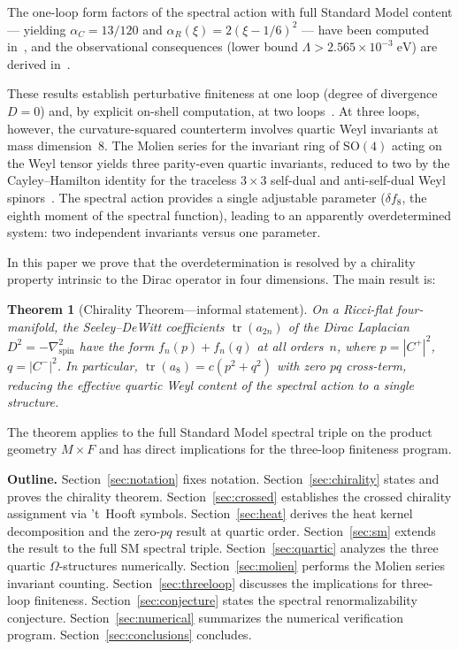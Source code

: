 \documentclass[12pt,a4paper]{article}
\newtheorem{theorem}{Theorem}[section]
\theoremstyle{definition}
\theoremstyle{remark}
\newcommand{\tr}{\operatorname{tr}}
\newcommand{\Lam}{\Lambda}
\begin{document}
The one-loop form factors of the spectral action with full Standard Model
content --- yielding $\alpha_C = 13/120$ and
$\alpha_R(\xi) = 2(\xi - 1/6)^2$ --- have been computed
in~\cite{Alfyorov:2026ff}, and the observational consequences (lower bound
$\Lam > 2.565 \times 10^{-3}\;\mathrm{eV}$) are derived
in~\cite{Alfyorov:2026ss}.

These results establish perturbative finiteness at one loop (degree of
divergence $D = 0$) and, by explicit on-shell computation, at two
loops~\cite{Goroff:1985th,Stelle:1976gc}.  At three loops, however, the
curvature-squared counterterm involves quartic Weyl invariants at mass
dimension~8.  The Molien series for the invariant ring of $\mathrm{SO}(4)$
acting on the Weyl tensor yields three parity-even quartic invariants,
reduced to two by the Cayley--Hamilton identity for the traceless $3 \times 3$
self-dual and anti-self-dual Weyl
spinors~\cite{Fulling:1992vm}.  The spectral action provides a single
adjustable parameter ($\delta f_8$, the eighth moment of the spectral
function), leading to an apparently overdetermined system:
two independent invariants versus one parameter.

In this paper we prove that the overdetermination is resolved by a chirality
property intrinsic to the Dirac operator in four dimensions.  The main result
is:

\begin{theorem}[Chirality Theorem---informal statement]
\label{thm:informal}
On a Ricci-flat four-manifold, the Seeley--DeWitt coefficients
$\tr(a_{2n})$ of the Dirac Laplacian $D^2 = -\nabla^2_{\mathrm{spin}}$
have the form $f_n(p) + f_n(q)$ at all orders~$n$, where
$p = |C^+|^2$, $q = |C^-|^2$.  In particular, $\tr(a_8) = c(p^2 + q^2)$
with zero $pq$ cross-term, reducing the effective quartic Weyl content of
the spectral action to a single structure.
\end{theorem}

\noindent The theorem applies to the full Standard Model spectral triple on the
product geometry $M \times F$ and has direct implications for the three-loop
finiteness program.

\medskip
\noindent\textbf{Outline.}
Section~\ref{sec:notation} fixes notation.  Section~\ref{sec:chirality}
states and proves the chirality theorem.  Section~\ref{sec:crossed}
establishes the crossed chirality assignment via 't~Hooft symbols.
Section~\ref{sec:heat} derives the heat kernel decomposition and the
zero-$pq$ result at quartic order.  Section~\ref{sec:sm} extends the
result to the full SM spectral triple.  Section~\ref{sec:quartic} analyzes
the three quartic $\Omega$-structures numerically.
Section~\ref{sec:molien} performs the Molien series invariant counting.
Section~\ref{sec:threeloop} discusses the implications for three-loop
finiteness.  Section~\ref{sec:conjecture} states the spectral
renormalizability conjecture.  Section~\ref{sec:numerical} summarizes the
numerical verification program.  Section~\ref{sec:conclusions} concludes.
\end{document}
